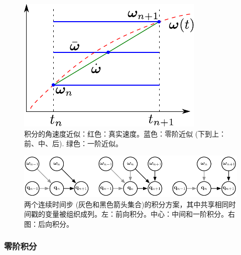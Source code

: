 \begin{figure}[tb]
\centering
\includegraphics{figures/integral}
\caption{积分的角速度近似：红色：真实速度。蓝色：零阶近似 (下到上：前、中、后). 绿色：一阶近似。}
\label{fig:quatInt}
\end{figure}

\begin{figure}[tb]
\begin{center}
\includegraphics{figures/integrate}
\caption{两个连续时间步 (灰色和黑色箭头集合)的积分方案，其中共享相同时间戳的变量被组织成列。左：前向积分。中心：中间和一阶积分。右图：后向积分。}
\label{fig:integrate}
\end{center}
\end{figure}


\subsubsection{零阶积分}


